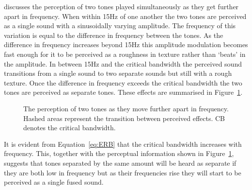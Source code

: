 		\citet{howard2009acoustics} discusses the perception of two tones played simultaneously as they get further
		apart in frequency. When within 15Hz of one another the two tones are perceived as a single sound with a
		sinusoidally varying amplitude. The frequency of this variation is equal to the difference in frequency
		between the tones. As the difference in frequency increases beyond 15Hz this amplitude modulation becomes
		fast enough for it to be perceived as a roughness in texture rather than `beats' in the amplitude. In
		between 15Hz and the critical bandwidth the perceived sound transitions from a single sound to two separate
		sounds but still with a rough texture. Once the difference in frequency exceeds the critical bandwidth the
		two tones are perceived as separate tones. These effects are summarised in Figure~\ref{fig:ToneSeparation}.

		\begin{figure}[h!]
			\centering
			\caption{The perception of two tones as they move further apart in frequency. Hashed areas
				 represent the transition between perceived effects. CB denotes the critical bandwidth.}
			\label{fig:ToneSeparation}
		\end{figure}

		It is evident from Equation~\ref{eq:ERB} that the critical bandwidth increases with frequency. This,
		together with the perceptual information shown in Figure~\ref{fig:ToneSeparation}, suggests that tones
		separated by the same amount will be heard as separate if they are both low in frequency but as their
		frequencies rise they will start to be perceived as a single fused sound.

